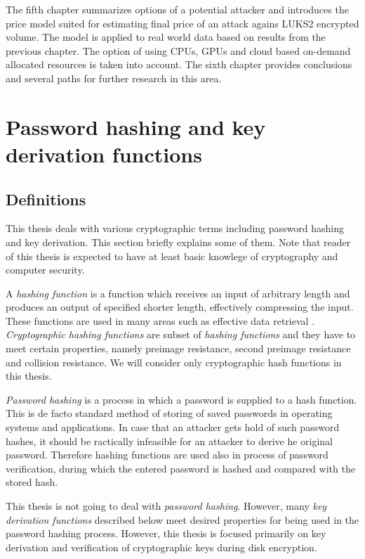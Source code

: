 \documentclass[nolof]{fithesis3}
\begin{document}
The fifth chapter summarizes options of a potential attacker and introduces the price model suited for estimating final price of an attack agains LUKS2 encrypted volume. The model is applied to real world data based on results from the previous chapter. The option of using CPUs, GPUs and cloud based on-demand allocated resources is taken into account. The sixth chapter provides conclusions and several paths for further research in this area.

\chapter{Password hashing and key derivation functions}

\section{Definitions}
\label{definitions}
This thesis deals with various cryptographic terms including password hashing and key derivation. This section briefly explains some of them. Note that reader of this thesis is expected to have at least basic knowlege of cryptography and computer security.

A \emph{hashing function} is a function which receives an input of arbitrary length and produces an output of specified shorter length, effectively compressing the input. These functions are used in many areas such as effective data retrieval \parencite{itmc14}. \emph{Cryptographic hashing functions} are subset of \emph{hashing functions} and they have to meet certain properties, namely preimage resistance, second preimage resistance and collision resistance. We will consider only cryptographic hash functions in this thesis.

\emph{Password hashing} is a process in which a password is supplied to a hash function. This is de facto standard method of storing of saved passwords in operating systems and applications. In case that an attacker gets hold of such password hashes, it should be ractically infeasible for an attacker to derive he original password. Therefore hashing functions are used also in process of password verification, during which the entered password is hashed and compared with the stored hash.

This thesis is not going to deal with \emph{password hashing}. However, many \emph{key derivation functions} described below meet desired properties for being used in the password hashing process. However, this thesis is focused primarily on key derivation and verification of cryptographic keys during disk encryption.
\end{document}
